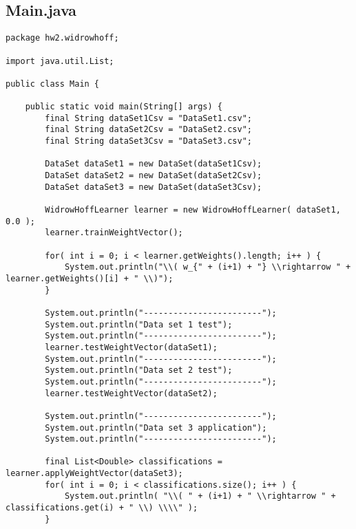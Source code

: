 \subsection{ Main.java }
\begin{lstlisting}
package hw2.widrowhoff;

import java.util.List;

public class Main {

	public static void main(String[] args) {
		final String dataSet1Csv = "DataSet1.csv";
		final String dataSet2Csv = "DataSet2.csv";
		final String dataSet3Csv = "DataSet3.csv";
		
		DataSet dataSet1 = new DataSet(dataSet1Csv);
		DataSet dataSet2 = new DataSet(dataSet2Csv);
		DataSet dataSet3 = new DataSet(dataSet3Csv);
		
		WidrowHoffLearner learner = new WidrowHoffLearner( dataSet1, 0.0 );
		learner.trainWeightVector();
		
		for( int i = 0; i < learner.getWeights().length; i++ ) {
			System.out.println("\\( w_{" + (i+1) + "} \\rightarrow " + learner.getWeights()[i] + " \\)");
		}
		
		System.out.println("------------------------");
		System.out.println("Data set 1 test");
		System.out.println("------------------------");
		learner.testWeightVector(dataSet1);
		System.out.println("------------------------");
		System.out.println("Data set 2 test");
		System.out.println("------------------------");
		learner.testWeightVector(dataSet2);
		
		System.out.println("------------------------");
		System.out.println("Data set 3 application");
		System.out.println("------------------------");
		
		final List<Double> classifications = learner.applyWeightVector(dataSet3);
		for( int i = 0; i < classifications.size(); i++ ) {
			System.out.println( "\\( " + (i+1) + " \\rightarrow " + classifications.get(i) + " \\) \\\\" );
		}
		

\end{lstlisting}
